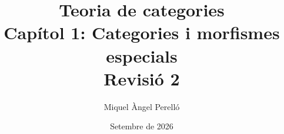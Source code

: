 \title{Teoria de categories\\[0.6em]
  \large Capítol 1: Categories i morfismes especials\\[0.4em]
  \normalsize Revisió 2}
\author{Miquel Àngel Perelló}
\date{Setembre de 2026}

\newcommand{\hypermetadata}{%
  \hypersetup{%
    pdftitle={Teoria de categories — Capítol 1: Categories i morfismes especials},
    pdfauthor={Miquel Àngel Perelló},
    pdfsubject={Revisió 2. Teoria, pràctica, exercicis proposats i test interactiu}%
  }%
}